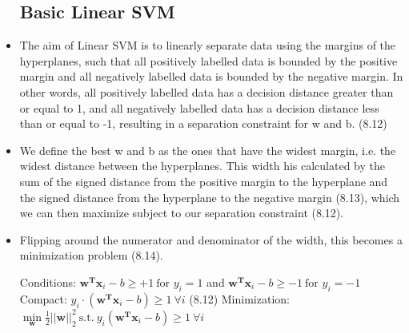 \documentclass[english]{latex4ei/latex4ei_sheet}
\begin{document}
\begin{sectionbox}
\begin{itemize}
\subsection{Basic Linear SVM}
\item The aim of Linear SVM is to linearly separate data using the margins of the hyperplanes, such that all positively labelled data is bounded by the positive margin and all negatively labelled data is bounded by the negative margin. In other words, all positively labelled data has a decision distance greater than or equal to 1, and all negatively labelled data has a decision distance less than or equal to -1, resulting in a separation constraint for w and b. (8.12)
\item We define the best w and b as the ones that have the widest margin, i.e. the widest distance between the hyperplanes. This width his calculated by the sum of the signed distance from the positive margin to the hyperplane and the signed distance from the hyperplane to the negative margin (8.13), which we can then maximize subject to our separation constraint (8.12). \item Flipping around the numerator and denominator of the width, this becomes a minimization problem (8.14).
\begin{emphbox}
    Conditions: $\mathbf{w^Tx}_i-b\ge +1 \ \mbox{for } y_i=
    1$ and $\mathbf{w^Tx}_i-b\ge -1 \ \mbox{for } y_i=
    -1$\\
    Compact: $y_i\cdot(\mathbf{w^Tx}_i-b)\ge1 \ \forall i$ (8.12)
    Minimization: $\min\limits_\mathbf{w}\frac{1}{2}||\mathbf{w}||^2_2 \ \mbox{s.t.} \ y_i(\mathbf{w^Tx}_i-b)\ge1 \ \forall i$
\end{emphbox}
\end{itemize}
\end{sectionbox}
\end{document}
